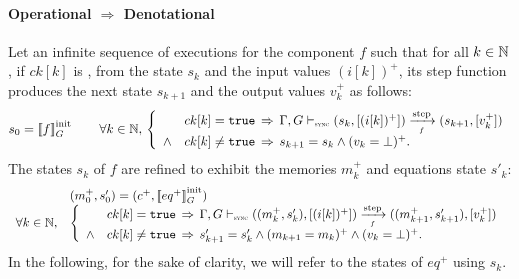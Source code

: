 \begin{skippableproof}
    \paragraph{Operational $\Rightarrow$ Denotational}
    \label{sec:semantics:grsync:theorems:equivalence:proof:op_to_den}
    Let an infinite sequence of executions for the component $f$ such that for all $k\in\mathbb{N}$,
    if $ck[k]$ is \true, from the state $s_k$ and the input values $(i[k])^+$, its step
    function produces the next state $s_{k+1}$ and the output values $v_k^+$ as follows:
    \begin{equation*}
        s_0 = \initsync{f} \qquad
        \forall k \in \N, \,
        \left\{
        \begin{array}{ll}
                   & ck[k] = \true \, \Rightarrow \, \compOpsem{s_k}{(i[k])^+}{f}{s_{k+1}}{v^+_k} \\
            \wedge & ck[k] \neq \true \, \Rightarrow \, s_{k+1} = s_k \wedge (v_k = \bot)^+.      \\
        \end{array}
        \right.
    \end{equation*}
    The states $s_k$ of $f$ are refined to exhibit the memories $m_k^+$ and equations state $s'_k$:
    \begin{equation*}
        \begin{array}{ll}
                              & (m_0^+, s'_0) = (c^+, \initsync{eq^+}) \\
            \forall k \in \N, &
            \left\{
            \begin{array}{ll}
                       & ck[k] = \true \, \Rightarrow \, \compOpsem{(m_k^+, s'_k)}{(i[k])^+}{f}{(m_{k+1}^+, s'_{k+1})}{v^+_k} \\
                \wedge & ck[k] \neq \true \, \Rightarrow \, s'_{k+1} = s'_k \wedge (m_{k+1} = m_k)^+ \wedge (v_k = \bot)^+.   \\
            \end{array}
            \right.                                                    \\
        \end{array}
    \end{equation*}
    In the following, for the sake of clarity, we will refer to the states of $eq^+$ using $s_k$.


\end{skippableproof}
